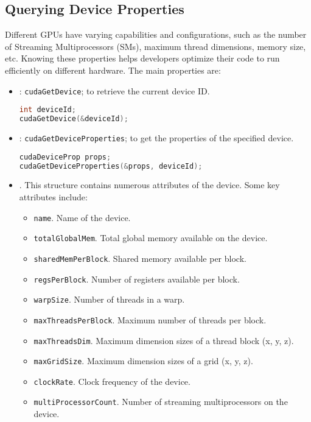 \subsection{Querying Device Properties}

Different GPUs have varying capabilities and configurations, such as the number of Streaming Multiprocessors (SMs), maximum thread dimensions, memory size, etc. Knowing these properties helps developers optimize their code to run efficiently on different hardware. The main properties are:
\begin{itemize}
    \item {}: \texttt{cudaGetDevice}; to retrieve the current device ID.
    \begin{lstlisting}[language=C++]
int deviceId;
cudaGetDevice(&deviceId);\end{lstlisting}

    \item {}: \texttt{cudaGetDeviceProperties}; to get the properties of the specified device.
    \begin{lstlisting}[language=C++]
cudaDeviceProp props;
cudaGetDeviceProperties(&props, deviceId);\end{lstlisting}

    \item {}. This structure contains numerous attributes of the device. Some key attributes include:
    \begin{itemize}
        \item \texttt{name}. Name of the device.
        \item \texttt{totalGlobalMem}. Total global memory available on the device.
        \item \texttt{sharedMemPerBlock}. Shared memory available per block.
        \item \texttt{regsPerBlock}. Number of registers available per block.
        \item \texttt{warpSize}. Number of threads in a warp.
        \item \texttt{maxThreadsPerBlock}. Maximum number of threads per block.
        \item \texttt{maxThreadsDim}. Maximum dimension sizes of a thread block (x, y, z).
        \item \texttt{maxGridSize}. Maximum dimension sizes of a grid (x, y, z).
        \item \texttt{clockRate}. Clock frequency of the device.
        \item \texttt{multiProcessorCount}. Number of streaming multiprocessors on the device.
    \end{itemize}
\end{itemize}

